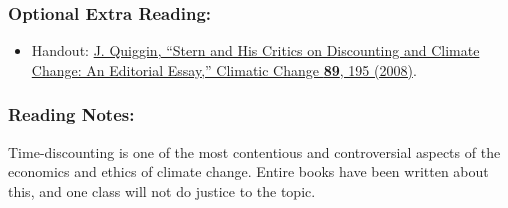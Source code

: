 \documentclass[
]{article}
\providecommand{\tightlist}{%
  \setlength{\itemsep}{0pt}\setlength{\parskip}{0pt}}
\begin{document}
\hypertarget{optional-extra-reading-2}{%
\subsubsection{Optional Extra Reading:}\label{optional-extra-reading-2}}

\begin{itemize}
\tightlist
\item
  Handout:
  \href{https://link-springer-com.proxy.library.vanderbilt.edu/content/pdf/10.1007\%2Fs10584-008-9434-9.pdf}{J.
  Quiggin, ``Stern and His Critics on Discounting and Climate Change: An
  Editorial Essay,'' Climatic Change \textbf{89}, 195 (2008)}.
\end{itemize}

\hypertarget{reading-notes-23}{%
\subsubsection{Reading Notes:}\label{reading-notes-23}}

Time-discounting is one of the most contentious and controversial
aspects of the economics and ethics of climate change. Entire books have
been written about this, and one class will not do justice to the topic.
\end{document}
